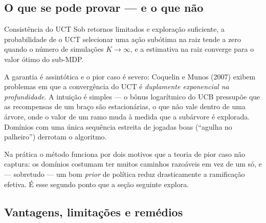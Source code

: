 \documentclass[a4paper, 11pt]{article}
\begin{document}
\subsection{O que se pode provar --- e o que não}

\begin{teobox}{Consistência do UCT}
Sob retornos limitados e exploração suficiente, a probabilidade de o UCT
selecionar uma ação subótima na raiz tende a zero quando o número de simulações
$K\to\infty$, e a estimativa na raiz converge para o valor ótimo do sub-MDP.
\end{teobox}

\begin{alertabox}
A garantia é assintótica e o pior caso é severo: Coquelin e Munos (2007)
exibem problemas em que a convergência do UCT é \emph{duplamente exponencial na
profundidade}. A intuição é simples --- o bônus logarítmico do UCB pressupõe
que as recompensas de um braço são estacionárias, o que não vale dentro de uma
árvore, onde o valor de um ramo muda à medida que a subárvore é explorada.
Domínios com uma única sequência estreita de jogadas boas (``agulha no
palheiro'') derrotam o algoritmo.
\end{alertabox}

Na prática o método funciona por dois motivos que a teoria de pior caso não
captura: os domínios costumam ter muitos caminhos razoáveis em vez de um só, e
--- sobretudo --- um bom \emph{prior} de política reduz drasticamente a
ramificação efetiva. É esse segundo ponto que a seção seguinte explora.

\subsection{Vantagens, limitações e remédios}
\end{document}
